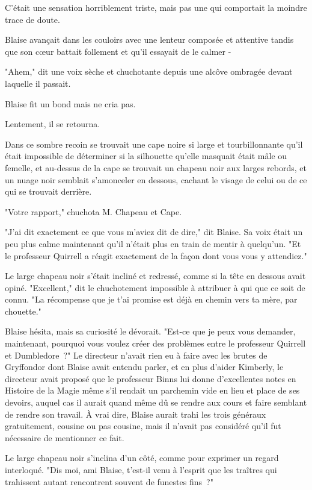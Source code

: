 C'était une sensation horriblement triste, mais pas une qui comportait la moindre trace de doute.


Blaise avançait dans les couloirs avec une lenteur composée et attentive tandis que son cœur battait follement et qu'il essayait de le calmer -

"Ahem," dit une voix sèche et chuchotante depuis une alcôve ombragée devant laquelle il passait.

Blaise fit un bond mais ne cria pas.

Lentement, il se retourna.

Dans ce sombre recoin se trouvait une cape noire si large et tourbillonnante qu'il était impossible de déterminer si la silhouette qu'elle masquait était mâle ou femelle, et au-dessus de la cape se trouvait un chapeau noir aux larges rebords, et un nuage noir semblait s'amonceler en dessous, cachant le visage de celui ou de ce qui se trouvait derrière.

"Votre rapport," chuchota M. Chapeau et Cape.

"J'ai dit exactement ce que vous m'aviez dit de dire," dit Blaise. Sa voix était un peu plus calme maintenant qu'il n'était plus en train de mentir à quelqu'un. "Et le professeur Quirrell a réagit exactement de la façon dont vous vous y attendiez."

Le large chapeau noir s'était incliné et redressé, comme si la tête en dessous avait opiné. "Excellent," dit le chuchotement impossible à attribuer à qui que ce soit de connu. "La récompense que je t'ai promise est déjà en chemin vers ta mère, par chouette."

Blaise hésita, mais sa curiosité le dévorait. "Est-ce que je peux vous demander, maintenant, pourquoi vous voulez créer des problèmes entre le professeur Quirrell et Dumbledore~?" Le directeur n'avait rien eu à faire avec les brutes de Gryffondor dont Blaise avait entendu parler, et en plus d'aider Kimberly, le directeur avait proposé que le professeur Binns lui donne d'excellentes notes en Histoire de la Magie même s'il rendait un parchemin vide en lieu et place de ses devoirs, auquel cas il aurait quand même dû se rendre aux cours et faire semblant de rendre son travail. À vrai dire, Blaise aurait trahi les trois généraux gratuitement, cousine ou pas cousine, mais il n'avait pas considéré qu'il fut nécessaire de mentionner ce fait.

Le large chapeau noir s'inclina d'un côté, comme pour exprimer un regard interloqué. "Dis moi, ami Blaise, t'est-il venu à l'esprit que les traîtres qui trahissent autant rencontrent souvent de funestes fins~?"

